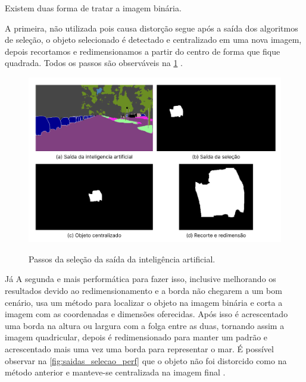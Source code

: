
Existem duas forma de tratar a imagem binária.

A primeira, não utilizada pois causa distorção segue após a saída dos algoritmos de seleção, o objeto selecionado é detectado e centralizado em uma nova imagem, depois recortamos e redimensionamos a partir do centro de forma que fique quadrada. Todos os passos são observáveis na \cref{fig:saidas_selecao} \cite{Embarcados}.

\begin{figure}[!ht]
	\centering
    \caption{Passos da seleção da saída da inteligência  artificial.}
	\includegraphics[width=1.0\textwidth]{figures/saidas_selecao.png}
	\label{fig:saidas_selecao}
\end{figure}

Já A segunda e mais performática para fazer isso, inclusive melhorando os resultados devido ao redimensionamento e a borda não chegarem a um bom cenário, usa um método para localizar o objeto na imagem binária e corta a imagem com as coordenadas e dimensões oferecidas. Após isso é acrescentado uma borda na altura ou largura com a folga entre as duas, tornando assim a imagem quadricular, depois é redimensionado para manter um padrão e acrescentado mais uma vez uma borda para representar o mar. É possível observar na \cref{fig:saidas_selecao_perf} que o objeto não foi distorcido como na método anterior e manteve-se centralizada na imagem final \cite{Embarcados}.


